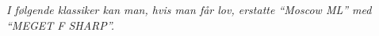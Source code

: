 \documentclass[10pt,a5paper,final,]{memoir}%
\begin{document}

\newpage

\newpage

\newpage
\emph{I følgende klassiker kan man, hvis man får lov, erstatte ``Moscow ML'' med
  ``MEGET F SHARP''.}
\vspace{-5mm}

\newpage

\newpage

\newpage

\newpage

\newpage

\end{document}
